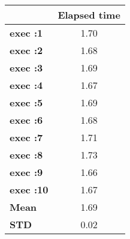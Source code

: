 \begin{tiny}\begin{tabular}{|l|c|}
\hline
&\textbf{Elapsed time}\\\hline
\textbf{exec :1}&1.70\\\hline
\textbf{exec :2}&1.68\\\hline
\textbf{exec :3}&1.69\\\hline
\textbf{exec :4}&1.67\\\hline
\textbf{exec :5}&1.69\\\hline
\textbf{exec :6}&1.68\\\hline
\textbf{exec :7}&1.71\\\hline
\textbf{exec :8}&1.73\\\hline
\textbf{exec :9}&1.66\\\hline
\textbf{exec :10}&1.67\\\hline
\textbf{ Mean}&1.69\\\hline
\textbf{ STD}&0.02\\\hline
\end{tabular}
\end{tiny}